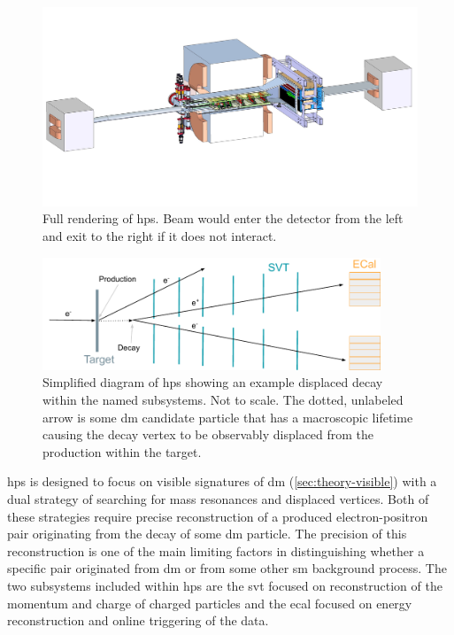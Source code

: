 \begin{figure}
	\centering
	\includegraphics[trim={15cm 10cm 10cm 5cm},clip,width=\textwidth]{figures/hps/experiment/hps_full_render.jpg}
	\caption{
		Full rendering of \ac{hps}.
		Beam would enter the detector from the left and exit to the right if it does not interact.
	}
	\label{fig:hps-full-render}
\end{figure}

\begin{figure}
	\centering
	\includegraphics[width=0.9\textwidth]{figures/hps/experiment/hps-diagram.pdf}
	\caption{
		Simplified diagram of \ac{hps} showing an example displaced decay within the named subsystems.
		Not to scale.
		The dotted, unlabeled arrow is some \ac{dm} candidate particle that has a macroscopic lifetime causing
		the decay vertex to be observably displaced from the production within the target.
	}
	\label{fig:hps-diagram}
\end{figure}

\ac{hps} is designed to focus on visible signatures of \ac{dm} (\cref{sec:theory-visible}) with
a dual strategy of searching for mass resonances and displaced vertices. Both of these strategies
require precise reconstruction of a produced electron-positron pair originating from the decay of
some \ac{dm} particle. The precision of this reconstruction is one of the main limiting factors
in distinguishing whether a specific pair originated from \ac{dm} or from some other \ac{sm}
background process. The two subsystems included within \ac{hps} are the \ac{svt} focused
on reconstruction of the momentum and charge of charged particles
and the \ac{ecal} focused on energy reconstruction and online triggering of the data.


